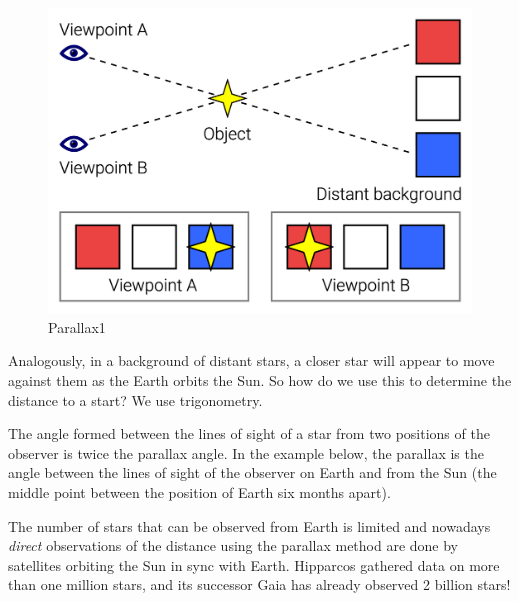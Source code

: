 \documentclass[
  letterpaper,
  DIV=11,
  numbers=noendperiod]{scrartcl}
\begin{document}
\begin{figure}

{\centering \includegraphics{img/Parallax_Example.png}

}

\caption{Parallax1}

\end{figure}

Analogously, in a background of distant stars, a closer star will appear
to move against them as the Earth orbits the Sun. So how do we use this
to determine the distance to a start? We use trigonometry.

The angle formed between the lines of sight of a star from two positions
of the observer is twice the parallax angle. In the example below, the
parallax is the angle between the lines of sight of the observer on
Earth and from the Sun (the middle point between the position of Earth
six months apart).

The number of stars that can be observed from Earth is limited and
nowadays \emph{direct} observations of the distance using the parallax
method are done by satellites orbiting the Sun in sync with Earth.
Hipparcos gathered data on more than one million stars, and its
successor Gaia has already observed 2 billion stars!
\end{document}
